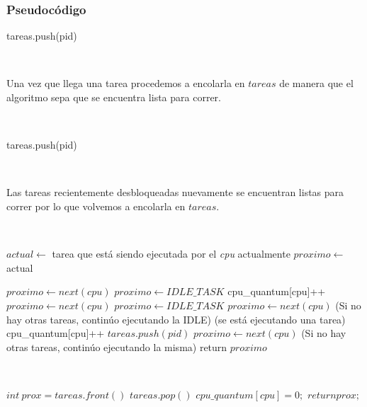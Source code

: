 \subsubsection{Pseudocódigo}

\begin{algorithmic}
      \State tareas.push(pid)
  \EndFunction
\end{algorithmic}

~

Una vez que llega una tarea procedemos a encolarla en $tareas$ de manera que el algoritmo sepa que se encuentra lista para correr.

~

\begin{algorithmic}
      \State tareas.push(pid)
  \EndFunction
\end{algorithmic}

~

Las tareas recientemente desbloqueadas nuevamente se encuentran listas para correr por lo que volvemos a encolarla en $tareas$.

~

\begin{algorithmic}
      \State $actual \gets$ tarea que está siendo ejecutada por el \emph{cpu} actualmente
      \State $proximo \gets$ actual
      
	      \State $proximo \gets next(cpu)$
	  \Else
	      \State $proximo \gets IDLE\_TASK$
	  \EndIf
      \EndIf
      \State
	  \State cpu\_quantum[cpu]++ 
	      \State $proximo \gets next(cpu)$
	  \Else
	      \State $proximo \gets IDLE\_TASK$
	  \EndIf
      \EndIf
		  \State $proximo \gets next(cpu)$
	      \EndIf
	      \State(Si no hay otras tareas, continúo ejecutando la IDLE)
	  \Else(se está ejecutando una tarea)
	      \State cpu\_quantum[cpu]++  
		      \State $tareas.push(pid)$
		      \State $proximo \gets next(cpu)$
		  \EndIf
		  \State(Si no hay otras tareas, continúo ejecutando la misma)
	      \EndIf
	   \EndIf
      \EndIf
      \State return $proximo$
  \EndFunction
\end{algorithmic}

~

\begin{algorithmic}
	\State $int \ prox = tareas.front()$
	\State $tareas.pop()$
	\State $cpu\_quantum[cpu] = 0;$
	\State $return prox;$
  \EndFunction
\end{algorithmic}

